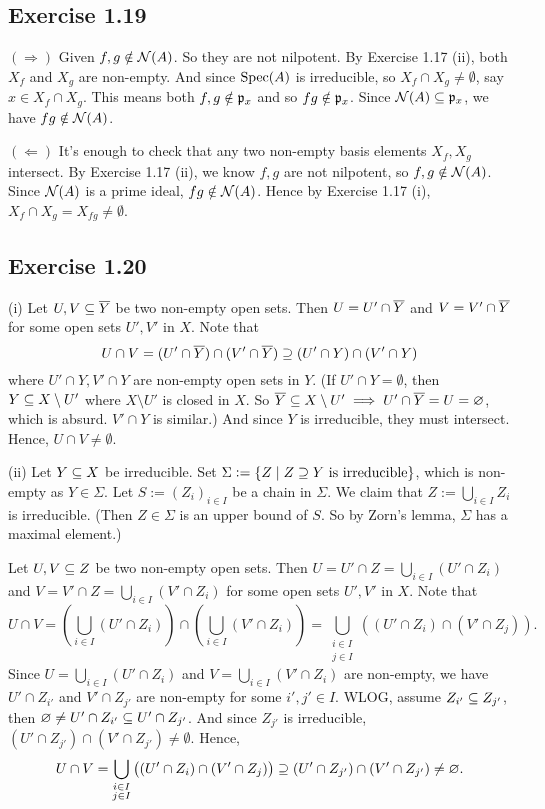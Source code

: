 \documentclass[../A&M.tex]{subfiles}
\begin{document}
\subsection*{Exercise 1.19}

$(\Rightarrow)$ Given $f,g\notin\mathcal{N}(A)$. So they are not nilpotent. By Exercise 1.17 (ii), both $X_f$ and $X_g$ are non-empty. And since $\operatorname{Spec}(A)$ is irreducible, so $X_f \cap X_g \neq \emptyset$, say $x\in X_f \cap X_g$. This means both $f,g\notin\mathfrak{p}_x$ and so $fg\notin\mathfrak{p}_x$. Since $\mathcal{N}(A)\subseteq \mathfrak{p}_x$, we have $fg\notin\mathcal{N}(A)$.

$(\Leftarrow)$ It's enough to check that any two non-empty basis elements $X_f,X_g$ intersect. By Exercise 1.17 (ii), we know $f,g$ are not nilpotent, so $f,g\notin\mathcal{N}(A)$. Since $\mathcal{N}(A)$ is a prime ideal, $fg\notin\mathcal{N}(A)$. Hence by Exercise 1.17 (i), $X_f \cap X_g = X_{fg}\neq\emptyset$.

\subsection*{Exercise 1.20}

(i) Let $U,V \subseteq \overline{Y}$ be two non-empty open sets. Then $U = U' \cap \overline{Y}$ and $V = V' \cap \overline{Y}$ for some open sets $U',V'$ in $X$. Note that
$$
U \cap V = (U' \cap \overline{Y}) \cap (V' \cap \overline{Y}) \supseteq (U' \cap Y) \cap (V' \cap Y)
$$
where $U' \cap Y, V' \cap Y$ are non-empty open sets in $Y$. (If $U' \cap Y = \emptyset$, then $Y \subseteq X \setminus U'$ where $X \setminus U'$ is closed in $X$. So $\overline{Y} \subseteq X \setminus U' \implies U' \cap \overline{Y} = U = \varnothing$, which is absurd. $V' \cap Y$ is similar.) And since $Y$ is irreducible, they must intersect. Hence, $U \cap V \neq \emptyset$.

(ii) Let $Y \subseteq X$ be irreducible. Set $\Sigma:=\{ Z \mid Z \supseteq Y \text{ is irreducible}\}$, which is non-empty as $Y\in\Sigma$. Let $S:=(Z_i)_{i\in I}$ be a chain in $\Sigma$. We claim that $Z := \bigcup_{i\in I} Z_i$ is irreducible. (Then $Z\in\Sigma$ is an upper bound of $S$. So by Zorn's lemma, $\Sigma$ has a maximal element.)

Let $U,V \subseteq Z$ be two non-empty open sets. Then $U = U' \cap Z = \bigcup_{i\in I} (U' \cap Z_i)$ and $V = V' \cap Z = \bigcup_{i\in I} (V' \cap Z_i)$ for some open sets $U',V'$ in $X$. Note that
$$
U \cap V
= \left( \bigcup_{i\in I} (U' \cap Z_i) \right) \cap \left( \bigcup_{i\in I} (V' \cap Z_i) \right)
= \bigcup_{\substack{ i\in I \\ j\in I }} \left( (U' \cap Z_i) \cap (V' \cap Z_j) \right).
$$
Since $U = \bigcup_{i\in I} (U' \cap Z_i)$ and $V = \bigcup_{i\in I} (V' \cap Z_i)$ are non-empty, we have $U' \cap Z_{i'}$ and $V' \cap Z_{j'}$ are non-empty for some $i',j' \in I$. WLOG, assume $Z_{i'} \subseteq Z_{j'}$, then $\varnothing \neq U' \cap Z_{i'} \subseteq U' \cap Z_{j'}$. And since $Z_{j'}$ is irreducible, $(U' \cap Z_{j'}) \cap (V' \cap Z_{j'}) \neq \emptyset$. Hence,
$$
U \cap V
= \bigcup_{\substack{ i\in I \\ j\in I }} \left( (U' \cap Z_i) \cap (V' \cap Z_j) \right)
\supseteq (U' \cap Z_{j'}) \cap (V' \cap Z_{j'})
\neq \varnothing.
$$
\end{document}
